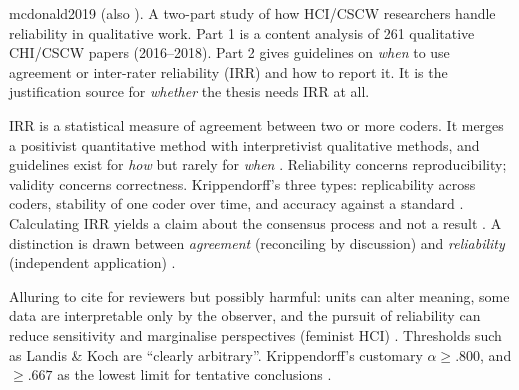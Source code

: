 \begin{papercard}{mcdonald2019}
   (also ). A two-part study of how HCI/CSCW researchers handle reliability in qualitative work. Part 1 is a content analysis of 261 qualitative CHI/CSCW papers (2016--2018). Part 2 gives guidelines on \emph{when} to use agreement or inter-rater reliability (IRR) and how to report it. It is the justification source for \emph{whether} the thesis needs IRR at all.

 IRR is a statistical measure of agreement between two or more coders. It merges a positivist quantitative method with interpretivist qualitative methods, and guidelines exist for \emph{how} but rarely for \emph{when} . Reliability concerns reproducibility; validity concerns correctness. Krippendorff's three types: replicability across coders, stability of one coder over time, and accuracy against a standard . Calculating IRR yields a claim about the consensus process and not a result . A distinction is drawn between \emph{agreement} (reconciling by discussion) and \emph{reliability} (independent application) .

 Alluring to cite for reviewers but possibly harmful: units can alter meaning, some data are interpretable only by the observer, and the pursuit of reliability can reduce sensitivity and marginalise perspectives (feminist HCI) . Thresholds such as Landis \& Koch are ``clearly arbitrary''. Krippendorff's customary $\alpha\ge.800$, and $\ge.667$ as the lowest limit for tentative conclusions .


\end{papercard}
